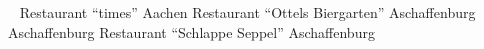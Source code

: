 \section{\sidejobs}\label{sec:sidejobs}
%
{\academicassistant}
{\newline{} \fhac}
{}{}{}
%
{\studentassistant}
{\newline{}\facultymeceng ~\rwthac}
{}{}{}
%
{\waiterbartender}
{\newline{}Restaurant \enquote{times}}
{Aachen}{}{}
%
{\waiterbartender}
{\newline{}Restaurant \enquote{Ottels Biergarten}}
{Aschaffenburg}{}{}
%
{\childcarer}
{\newline{}\localholidaycamp}
{Aschaffenburg}{}{}
%
{\waiterbartender}
{\newline{}Restaurant \enquote{Schlappe Seppel}}
{Aschaffenburg}{}{}